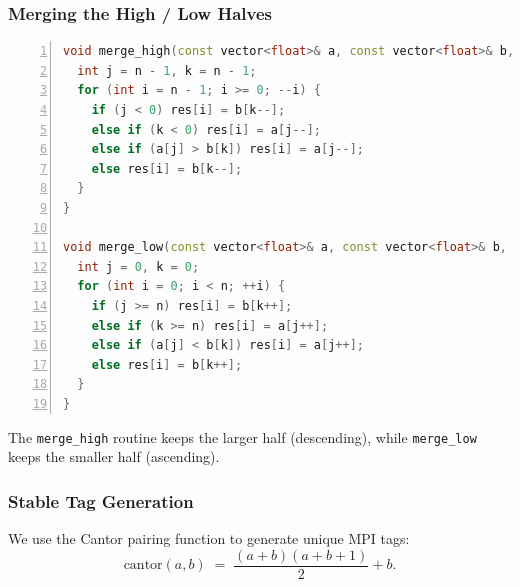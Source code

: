 \documentclass{article}
\begin{document}
\subsubsection*{Merging the High / Low Halves}
\begin{lstlisting}[language=C++, basicstyle=\ttfamily\small, keywordstyle=\color{blue}\bfseries, commentstyle=\color{gray}\itshape, stringstyle=\color{red}, numbers=left, numberstyle=\tiny\color{gray}, stepnumber=1, frame=single, showstringspaces=false, breaklines=true]
void merge_high(const vector<float>& a, const vector<float>& b, vector<float>& res, int n) {
  int j = n - 1, k = n - 1;
  for (int i = n - 1; i >= 0; --i) {
    if (j < 0) res[i] = b[k--];
    else if (k < 0) res[i] = a[j--];
    else if (a[j] > b[k]) res[i] = a[j--];
    else res[i] = b[k--];
  }
}

void merge_low(const vector<float>& a, const vector<float>& b, vector<float>& res, int n) {
  int j = 0, k = 0;
  for (int i = 0; i < n; ++i) {
    if (j >= n) res[i] = b[k++];
    else if (k >= n) res[i] = a[j++];
    else if (a[j] < b[k]) res[i] = a[j++];
    else res[i] = b[k++];
  }
}
\end{lstlisting}

The \texttt{merge\_high} routine keeps the larger half (descending), while \texttt{merge\_low} keeps the smaller half (ascending).

\subsubsection*{Stable Tag Generation}
We use the Cantor pairing function to generate unique MPI tags:
\[
\text{cantor}(a,b) \;=\; \frac{(a+b)(a+b+1)}{2} + b.
\]
\end{document}
